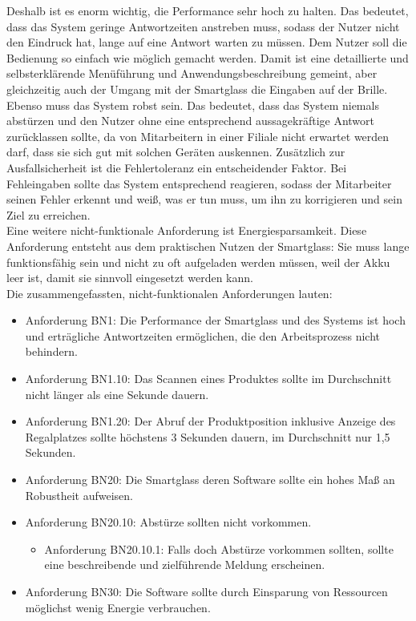 Deshalb ist es enorm wichtig, die Performance sehr hoch zu halten. Das bedeutet, dass das System geringe Antwortzeiten anstreben muss, sodass der Nutzer nicht den Eindruck hat, lange auf eine Antwort warten zu müssen. 
Dem Nutzer soll die Bedienung so einfach wie möglich gemacht werden. Damit ist  eine detaillierte und selbsterklärende Menüführung und Anwendungsbeschreibung gemeint, aber gleichzeitig auch der Umgang mit der Smartglass \bzw die Eingaben auf der Brille. \\
Ebenso muss das System robst sein. Das bedeutet, dass das System niemals abstürzen und den Nutzer ohne eine entsprechend aussagekräftige Antwort zurücklassen sollte, da von Mitarbeitern in einer Filiale nicht erwartet werden darf, dass sie sich gut mit solchen Geräten auskennen. Zusätzlich zur Ausfallsicherheit ist die Fehlertoleranz ein entscheidender Faktor. Bei Fehleingaben sollte das System entsprechend reagieren, sodass der Mitarbeiter seinen Fehler erkennt und weiß, was er tun muss, um ihn zu korrigieren und sein Ziel zu erreichen. \\
Eine weitere nicht-funktionale Anforderung ist Energiesparsamkeit. Diese Anforderung entsteht aus dem praktischen Nutzen der Smartglass: Sie muss lange funktionsfähig sein und nicht zu oft aufgeladen werden müssen, weil der Akku leer ist, damit sie sinnvoll eingesetzt werden kann.\\

Die zusammengefassten, nicht-funktionalen Anforderungen lauten:
\begin{itemize}
	\item Anforderung BN1: Die Performance der Smartglass und des Systems ist hoch und erträgliche Antwortzeiten ermöglichen, die den Arbeitsprozess nicht behindern.
	\item Anforderung BN1.10: Das Scannen eines Produktes sollte im Durchschnitt nicht länger als eine Sekunde dauern.
	\item Anforderung BN1.20: Der Abruf der Produktposition inklusive Anzeige des Regalplatzes sollte höchstens 3 Sekunden dauern, im Durchschnitt nur 1,5 Sekunden.
	\item Anforderung BN20: Die Smartglass \bzw deren Software sollte ein hohes Maß an Robustheit aufweisen.
	\item Anforderung BN20.10: Abstürze sollten nicht vorkommen. 
	\begin{itemize}
		\item Anforderung BN20.10.1: Falls doch Abstürze vorkommen sollten, sollte eine beschreibende und zielführende Meldung erscheinen.
	\end{itemize}
	\item Anforderung BN30: Die Software sollte durch Einsparung von Ressourcen möglichst wenig Energie verbrauchen.
\end{itemize}

